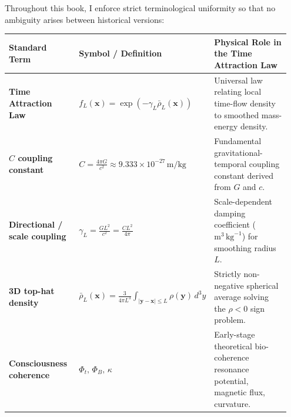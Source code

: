 \documentclass[10pt,a4paper]{article}
\begin{document}
\vspace{1.5mm}
\par
Throughout this book, I enforce strict terminological uniformity so that no ambiguity arises between historical versions:
\begin{center}\vspace{-2pt}
{\footnotesize
\begin{tabular}{@{}>{\bfseries}p{0.28\linewidth}p{0.24\linewidth}p{0.43\linewidth}@{}}
\toprule
Standard Term & Symbol / Definition & Physical Role in the Time Attraction Law \\
\midrule
Time Attraction Law & $f_L(\mathbf{x}) = \exp(-\gamma_L \bar{\rho}_L(\mathbf{x}))$ & Universal law relating local time-flow density to smoothed mass-energy density. \\
$C$ coupling constant & $C = \frac{4\pi G}{c^2} \approx 9.333\times 10^{-27}\,\text{m/kg}$ & Fundamental gravitational-temporal coupling constant derived from $G$ and $c$. \\
Directional / scale coupling & $\gamma_L = \frac{G L^2}{c^2} = \frac{C L^2}{4\pi}$ & Scale-dependent damping coefficient ($\text{m}^3\,\text{kg}^{-1}$) for smoothing radius $L$. \\
3D top-hat density & $\bar{\rho}_L(\mathbf{x}) = \frac{3}{4\pi L^3}\int_{|\mathbf{y}-\mathbf{x}|\le L}\rho(\mathbf{y})\,d^3y$ & Strictly non-negative spherical average solving the $\rho<0$ sign problem. \\
Consciousness coherence & $\Phi_t,\,\Phi_B,\,\kappa$ & Early-stage theoretical bio-coherence resonance potential, magnetic flux, curvature. \\
\bottomrule
\end{tabular}}
\end{center}
\end{document}
